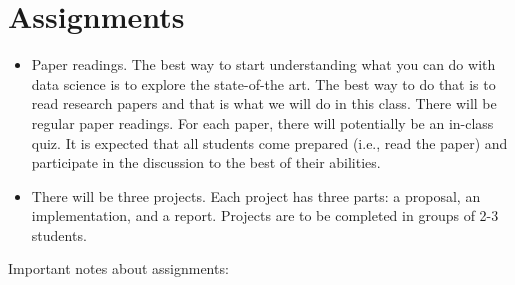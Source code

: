 \documentclass[11pt,article,oneside]{memoir} %
\begin{document}
\section{Assignments}

\begin{itemize}
    \item Paper readings. The best way to start understanding what you can do with data science is
    to explore the state-of-the art. The best way to do that is to read research papers and that
    is what we will do in this class. There will be regular paper readings. For each paper,
    there will potentially be an in-class quiz.
    It is expected that all students come prepared (i.e., read the paper) and participate in the
    discussion to the best of their abilities.
    \item There will be three projects. Each project has three parts: a proposal, an implementation, and a report.
    Projects are to be completed in groups of 2-3 students.
\end{itemize}

Important notes about assignments:
\end{document}

